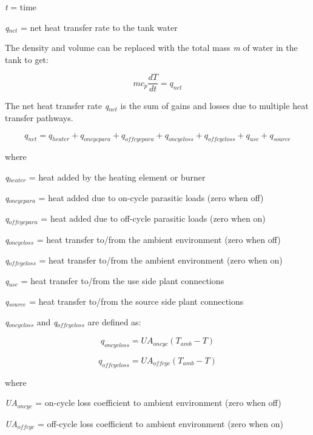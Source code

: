 \emph{t} = time

\emph{q\(_{net}\)} = net heat transfer rate to the tank water

The density and volume can be replaced with the total mass \emph{m} of water in the tank to get:

\begin{equation}
m{c_p}\frac{{dT}}{{dt}} = {q_{net}}
\end{equation}

The net heat transfer rate \emph{q\(_{net}\)} is the sum of gains and losses due to multiple heat transfer pathways.

\begin{equation}
{q_{net}} = {q_{heater}} + {q_{oncycpara}} + {q_{offcycpara}} + {q_{oncycloss}} + {q_{offcycloss}} + {q_{use}} + {q_{source}}
\end{equation}

where

\emph{q\(_{heater}\)} = heat added by the heating element or burner

\emph{q\(_{oncycpara}\)} = heat added due to on-cycle parasitic loads (zero when off)

\emph{q\(_{offcycpara}\)} = heat added due to off-cycle parasitic loads (zero when on)

\emph{q\(_{oncycloss}\)} = heat transfer to/from the ambient environment (zero when off)

\emph{q\(_{offcycloss}\)} = heat transfer to/from the ambient environment (zero when on)

\emph{q\(_{use}\)} = heat transfer to/from the use side plant connections

\emph{q\(_{source}\)} = heat transfer to/from the source side plant connections

\emph{q\(_{oncycloss}\)} and \emph{q\(_{offcycloss}\)} are defined as:

\begin{equation}
{q_{oncycloss}} = U{A_{oncyc}}\left( {{T_{amb}} - T} \right)
\end{equation}

\begin{equation}
{q_{offcycloss}} = U{A_{offcyc}}\left( {{T_{amb}} - T} \right)
\end{equation}

where

\emph{UA\(_{oncyc}\)} = on-cycle loss coefficient to ambient environment (zero when off)

\emph{UA\(_{offcyc}\)} = off-cycle loss coefficient to ambient environment (zero when on)

